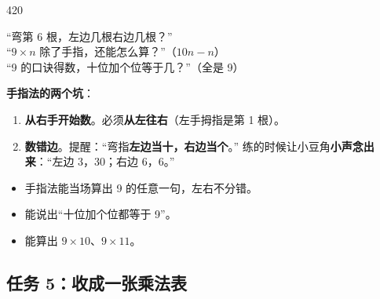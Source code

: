 \begin{lesson}{4}{20}
\begin{saybox}
“弯第 6 根，左边几根右边几根？”\\
“$9\times n$ 除了手指，还能怎么算？”（$10n-n$）\\
“9 的口诀得数，十位加个位等于几？”（全是 9）
\end{saybox}

\begin{pitbox}
\textbf{手指法的两个坑}：
\begin{enumerate}[label=\arabic*、]
  \item \textbf{从右手开始数}。必须\textbf{从左往右}（左手拇指是第 1 根）。
  \item \textbf{数错边}。提醒：“弯指\textbf{左边当十，右边当个}。”
        练的时候让小豆角\textbf{小声念出来}：“左边 3，30；右边 6，6。”
\end{enumerate}
\end{pitbox}

\begin{passbox}
\begin{itemize}
  \item 手指法能当场算出 9 的任意一句，左右不分错。
  \item 能说出“十位加个位都等于 9”。
  \item 能算出 $9\times10$、$9\times11$。
\end{itemize}
\end{passbox}
\end{lesson}

\subsection{任务 5：收成一张乘法表}

